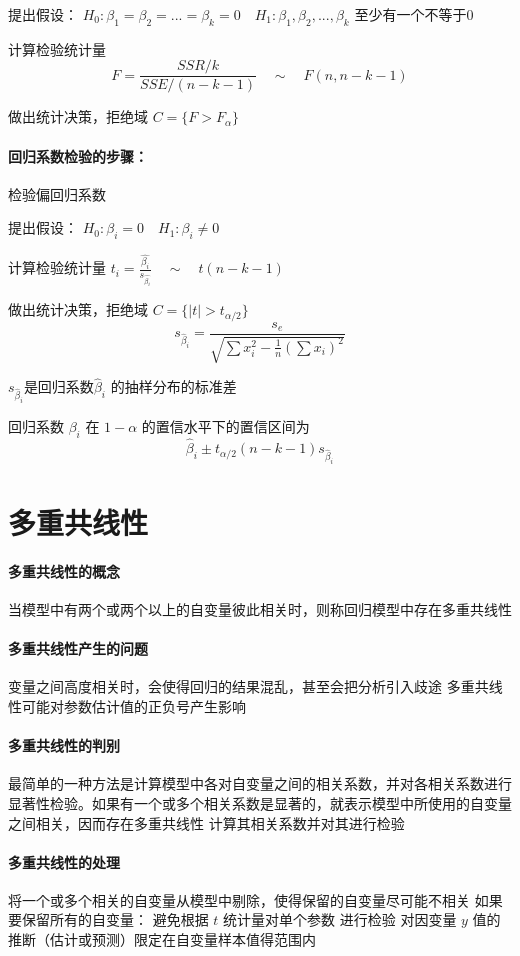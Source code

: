 \documentclass[UTF8,10pt]{book}
\begin{document}
{提出假设： $ H_0 : \beta_1 = \beta_2 = ... = \beta_k = 0 \quad H_1 : \beta_1 , \beta_2 , ... , \beta_k$ 至少有一个不等于0 

计算检验统计量 
$$ F = \frac{SSR/k}{SSE/(n-k-1)} \quad \sim \quad F(n,n-k-1) $$ 

做出统计决策，拒绝域 $ C = \{ F>F_{\alpha} \} $

\paragraph{回归系数检验的步骤：}	检验偏回归系数

提出假设： $ H_0 : \beta_i = 0 \quad H_1 : \beta_i \neq 0$ 

计算检验统计量 $t_i = \frac{\hat{\beta_i}}{s_{\hat{\beta_i}}} \quad \sim \quad t(n-k-1)$ 

做出统计决策，拒绝域 $ C = \{ |t|>t_{\alpha / 2} \} $ 
$$ s_{\hat{\beta}_i} = \frac{s_e}{\sqrt{\sum x_i^2 - \frac{1}{n}\left(\sum x_i\right)^2}} $$ 

$ s_{\hat{\beta}_i} $是回归系数$\hat{\beta}_i$ 的抽样分布的标准差

回归系数 $\beta_i$ 在 $1-\alpha$ 的置信水平下的置信区间为	
$$ \hat{\beta}_i \pm t_{\alpha /2}(n-k-1)s_{\hat{\beta}_i} $$

\section{多重共线性}
\paragraph{多重共线性的概念}	当模型中有两个或两个以上的自变量彼此相关时，则称回归模型中存在多重共线性

\paragraph{多重共线性产生的问题}	变量之间高度相关时，会使得回归的结果混乱，甚至会把分析引入歧途 多重共线性可能对参数估计值的正负号产生影响

\paragraph{多重共线性的判别}	最简单的一种方法是计算模型中各对自变量之间的相关系数，并对各相关系数进行显著性检验。如果有一个或多个相关系数是显著的，就表示模型中所使用的自变量之间相关，因而存在多重共线性 计算其相关系数并对其进行检验

\paragraph{多重共线性的处理}	将一个或多个相关的自变量从模型中剔除，使得保留的自变量尽可能不相关 如果要保留所有的自变量： 避免根据 $t$ 统计量对单个参数 进行检验 对因变量 $y$ 值的推断（估计或预测）限定在自变量样本值得范围内

}
\end{document}
